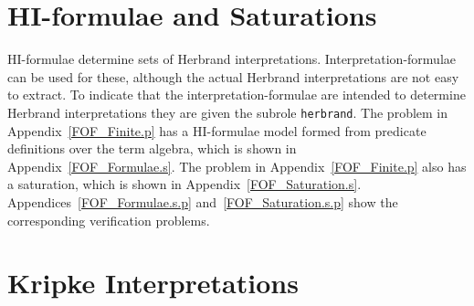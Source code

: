 \documentclass{easychair}
\begin{document}
\section{HI-formulae and Saturations}
\label{NewHerbrand}

HI-formulae determine sets of Herbrand interpretations.
Interpretation-formulae can be used for these, although the actual Herbrand interpretations are
not easy to extract.
To indicate that the interpretation-formulae are intended to determine Herbrand interpretations 
they are given the subrole {\tt herbrand}.
The problem in Appendix~\ref{FOF_Finite.p} has a HI-formulae model formed from predicate 
definitions over the term algebra, which is shown in Appendix~\ref{FOF_Formulae.s}.
The problem in Appendix~\ref{FOF_Finite.p} also has a saturation, which is shown in
Appendix~\ref{FOF_Saturation.s}.
Appendices~\ref{FOF_Formulae.s.p} and~\ref{FOF_Saturation.s.p} show the corresponding verification 
problems.

\section{Kripke Interpretations}
\label{NewKripke}
 
\end{document}
